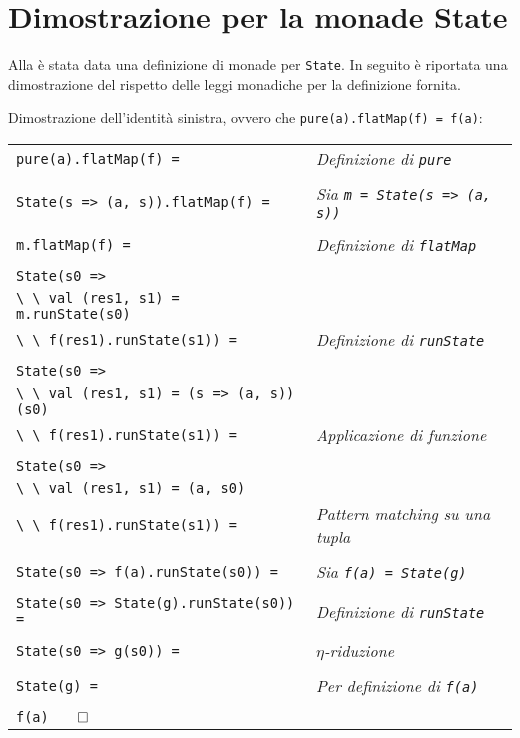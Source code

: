 \section{Dimostrazione per la monade State}
\label{dimostrazione-per-la-monade-state}

Alla  è stata data una definizione di monade per \lstinline{State}. In seguito è riportata una dimostrazione del rispetto delle leggi monadiche per la definizione fornita.

Dimostrazione dell'identità sinistra, ovvero che \lstinline{pure(a).flatMap(f) = f(a)}:

\begin{tabularx}{\textwidth}{ll}
\lstinline{pure(a).flatMap(f) =}               & \emph{Definizione di \lstinline{pure}}\\
\\
\lstinline{State(s => (a, s)).flatMap(f) =}    & \emph{Sia \lstinline{m = State(s => (a, s))}}\\
\\
\lstinline{m.flatMap(f) =}                     & \emph{Definizione di 
\lstinline{flatMap}}\\
\\
\lstinline{State(s0 =>} \\
\lstinline{\ \ val (res1, s1) = m.runState(s0)}\\
\lstinline{\ \ f(res1).runState(s1)) =}      & \emph{Definizione di \lstinline{runState}}\\
\\
\lstinline{State(s0 =>} \\
\lstinline{\ \ val (res1, s1) = (s => (a, s))(s0)}\\
\lstinline{\ \ f(res1).runState(s1)) =}      & \emph{Applicazione di funzione}\\
\\
\lstinline{State(s0 =>} \\
\lstinline{\ \ val (res1, s1) = (a, s0)}\\
\lstinline{\ \ f(res1).runState(s1)) =}      & \emph{Pattern matching su una tupla}\\
\\
\lstinline{State(s0 => f(a).runState(s0)) =} & \emph{Sia \lstinline{f(a) = State(g)}}\\
\\
\lstinline{State(s0 => State(g).runState(s0)) =} & \emph{Definizione di \lstinline{runState}}\\
\\
\lstinline{State(s0 => g(s0)) =}                   & \emph{$\eta$-riduzione}\\
\\
\lstinline{State(g) =}                             & \emph{Per definizione di \lstinline{f(a)}}\\
\\
\lstinline{f(a)}$\qed$ &
\end{tabularx}

